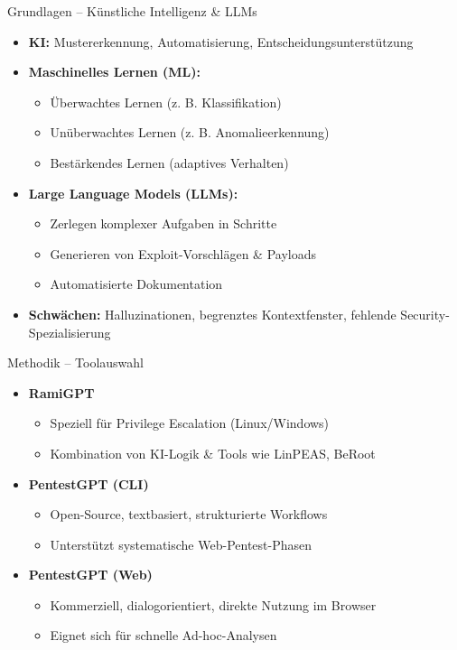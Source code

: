 \documentclass[
	aspectratio=169,	%
	onlytextwidth,		%
	t,					%
	]{beamer}
\begin{document}
\begin{frame}{Grundlagen – Künstliche Intelligenz \& LLMs}
	\begin{itemize}
		\item \textbf{KI:} Mustererkennung, Automatisierung, Entscheidungsunterstützung
		\item \textbf{Maschinelles Lernen (ML):}
		\begin{itemize}
			\item Überwachtes Lernen (z. B. Klassifikation)
			\item Unüberwachtes Lernen (z. B. Anomalieerkennung)
			\item Bestärkendes Lernen (adaptives Verhalten)
		\end{itemize}
		\item \textbf{Large Language Models (LLMs):}
		\begin{itemize}
			\item Zerlegen komplexer Aufgaben in Schritte
			\item Generieren von Exploit-Vorschlägen \& Payloads
			\item Automatisierte Dokumentation
		\end{itemize}
		\item \textbf{Schwächen:} Halluzinationen, begrenztes Kontextfenster, fehlende Security-Spezialisierung
	\end{itemize}
\end{frame}


\begin{frame}{Methodik – Toolauswahl}
	\begin{itemize}
		\item \textbf{RamiGPT}
		\begin{itemize}
			\item Speziell für Privilege Escalation (Linux/Windows)
			\item Kombination von KI-Logik \& Tools wie LinPEAS, BeRoot
		\end{itemize}
		
		\item \textbf{PentestGPT (CLI)}
		\begin{itemize}
			\item Open-Source, textbasiert, strukturierte Workflows
			\item Unterstützt systematische Web-Pentest-Phasen
		\end{itemize}
		
		\item \textbf{PentestGPT (Web)}
		\begin{itemize}
			\item Kommerziell, dialogorientiert, direkte Nutzung im Browser
			\item Eignet sich für schnelle Ad-hoc-Analysen
		\end{itemize}
	\end{itemize}
\end{frame}
\end{document}
